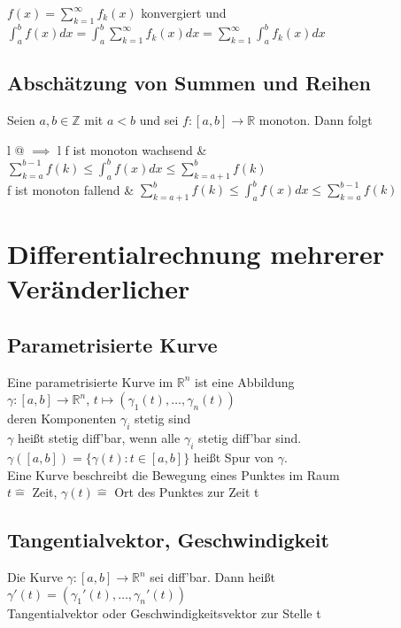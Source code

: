 \documentclass[a4paper,9pt]{extarticle}
\newcommand{\suminfty}[1][k = 1]{\sum_{#1}^{\infty}}
\newcommand{\intab}[1] {\int_{a}^{b} #1 dx}
\begin{document}
	$f(x) = \suminfty[k = 1]{} f_k(x)$ konvergiert und \\
	
	$\intab{f(x)} = \intab{\suminfty[k = 1]{} f_k(x)} = \suminfty[k = 1]{} \intab{f_k(x)}$
	
	\subsection*{Abschätzung von Summen und Reihen}
	Seien $a,b \in \mathbb{Z}$ mit $a < b$ und sei $f : [a,b] → \mathbb{R}$ monoton. Dann folgt \\
	
	\begin{tabular}{l @ {$\implies$} l}
		f ist monoton wachsend & $\sum_{k = a}^{b-1} f(k) ≤ \intab{f(x)} ≤ \sum_{k = a + 1}^{b} f(k)$ \\
		f ist monoton fallend & $\sum_{k = a + 1}^{b} f(k) ≤ \intab{f(x)} ≤ \sum_{k = a}^{b - 1} f(k)$
	\end{tabular}
	
	
	\pagebreak
\section*{Differentialrechnung mehrerer Veränderlicher}
	\subsection*{Parametrisierte Kurve}
	Eine parametrisierte Kurve im $\mathbb{R}^n$ ist eine Abbildung \\
	$\gamma : [a,b] → \mathbb{R}^n$, $t \mapsto (\gamma_1(t), \dots, \gamma_n(t))$ \\
	deren Komponenten $\gamma_i$ stetig sind \\
	
	$\gamma$ heißt stetig diff'bar, wenn alle $\gamma_i$ stetig diff'bar sind. \\
	
	$\gamma([a,b]) = \{\gamma(t) : t \in [a,b]\}$ heißt Spur von $\gamma$. \\
	
	Eine Kurve beschreibt die Bewegung eines Punktes im Raum \\
	$t \hat{=}$ Zeit, $\gamma(t) \hat{=}$ Ort des Punktes zur Zeit t
	
	\subsection*{Tangentialvektor, Geschwindigkeit}
	Die Kurve $\gamma : [a,b] → \mathbb{R}^n$ sei diff'bar. Dann heißt \\
	$\gamma'(t) = (\gamma_1'(t), \dots, \gamma_n'(t))$ \\
	Tangentialvektor oder Geschwindigkeitsvektor zur Stelle t \\
	
\end{document}
